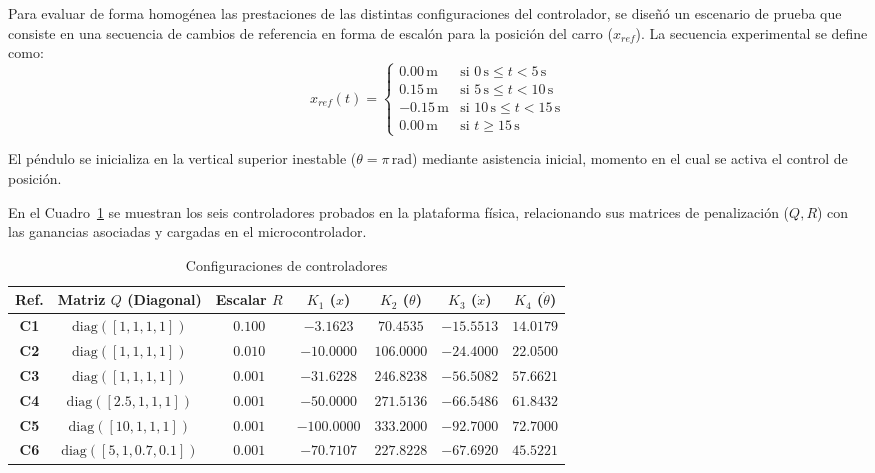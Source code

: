 \documentclass[11pt,fleqn]{book} %
\begin{document}
Para evaluar de forma homogénea las prestaciones de las distintas configuraciones del controlador, se diseñó un escenario de prueba que consiste en una secuencia de cambios de referencia en forma de escalón para la posición del carro ($x_{ref}$). La secuencia experimental se define como:
\begin{equation}
	x_{ref}(t) = 
	\begin{cases} 
		0.00\,\text{m} & \text{si } 0\,\text{s} \le t < 5\,\text{s} \\
		0.15\,\text{m} & \text{si } 5\,\text{s} \le t < 10\,\text{s} \\
		-0.15\,\text{m} & \text{si } 10\,\text{s} \le t < 15\,\text{s} \\
		0.00\,\text{m} & \text{si } t \ge 15\,\text{s}
	\end{cases}
\end{equation}

El péndulo se inicializa en la vertical superior inestable ($\theta = \pi\,\text{rad}$) mediante asistencia inicial, momento en el cual se activa el control de posición.

En el Cuadro~\ref{tab:comparativa_lqr} se muestran los seis controladores probados en la plataforma física, relacionando sus matrices de penalización ($Q, R$) con las ganancias asociadas y cargadas en el microcontrolador.

\begin{table}[!htbp]
	\centering
	\caption{Configuraciones de controladores}
	\label{tab:comparativa_lqr}
	\begin{tabular}{ccccccc}
		\hline
		\textbf{Ref.} & \textbf{Matriz $Q$ (Diagonal)} & \textbf{Escalar $R$} & \textbf{$K_1$ ($x$)} & \textbf{$K_2$ ($\theta$)} & \textbf{$K_3$ ($\dot{x}$)} & \textbf{$K_4$ ($\dot{\theta}$)} \\ \hline
		\textbf{C1}   & $\text{diag}([1, 1, 1, 1])$ & $0.100$ & $-3.1623$ & $70.4535$ & $-15.5513$ & $14.0179$ \\
		\textbf{C2}   & $\text{diag}([1, 1, 1, 1])$ & $0.010$ & $-10.0000$ & $106.0000$ & $-24.4000$ & $22.0500$ \\
		\textbf{C3}   & $\text{diag}([1, 1, 1, 1])$ & $0.001$ & $-31.6228$ & $246.8238$ & $-56.5082$ & $57.6621$ \\
		\textbf{C4}   & $\text{diag}([2.5, 1, 1, 1])$ & $0.001$ & $-50.0000$ & $271.5136$ & $-66.5486$ & $61.8432$ \\
		\textbf{C5}   & $\text{diag}([10, 1, 1, 1])$ & $0.001$ & $-100.0000$ & $333.2000$ & $-92.7000$ & $72.7000$ \\
		\textbf{C6}   & $\text{diag}([5, 1, 0.7, 0.1])$ & $0.001$ & $-70.7107$ & $227.8228$ & $-67.6920$ & $45.5221$ \\ \hline
	\end{tabular}
\end{table}
\end{document}
